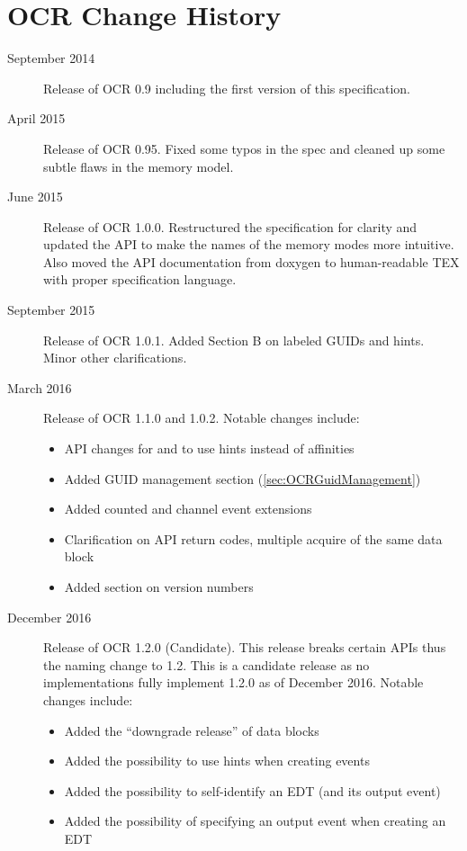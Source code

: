 %

\chapter{OCR Change  History}
\label{chap:OCR Change History}
\label{chap:Appendix D}
\begin{description}
\item[September 2014] Release of OCR 0.9 including the first version
  of this specification.
\item[April 2015] Release of OCR 0.95.  Fixed some typos in the spec and
cleaned up some subtle flaws in the memory model.
\item[June 2015] Release of OCR 1.0.0. Restructured the specification for clarity and
updated the API to make the names of the memory modes more intuitive. Also moved
the API documentation from doxygen to human-readable TEX with proper specification
language.
\item[September 2015] Release of OCR 1.0.1. Added Section B on labeled GUIDs and
hints. Minor other clarifications.
\item[March 2016] Release of OCR 1.1.0 and 1.0.2. Notable changes include:
\begin{itemize}
\item{API changes for  and  to
  use hints instead of affinities}
\item{Added GUID management section (\ref{sec:OCRGuidManagement})}
\item{Added counted and channel event extensions}
\item{Clarification on API return codes, multiple acquire of the same
  data block}
\item{Added section on version numbers}
\end{itemize}
\item[December 2016] Release of OCR 1.2.0 (Candidate). This release breaks certain
APIs thus the naming change to 1.2. This is a candidate release as no implementations
fully implement 1.2.0 as of December 2016. Notable changes include:
\begin{itemize}
\item{Added the ``downgrade release'' of data blocks}
\item{Added the possibility to use hints when creating events}
\item{Added the possibility to self-identify an EDT (and its output event)}
\item{Added the possibility of specifying an output event when creating an EDT}

\end{itemize}
\end{description}
